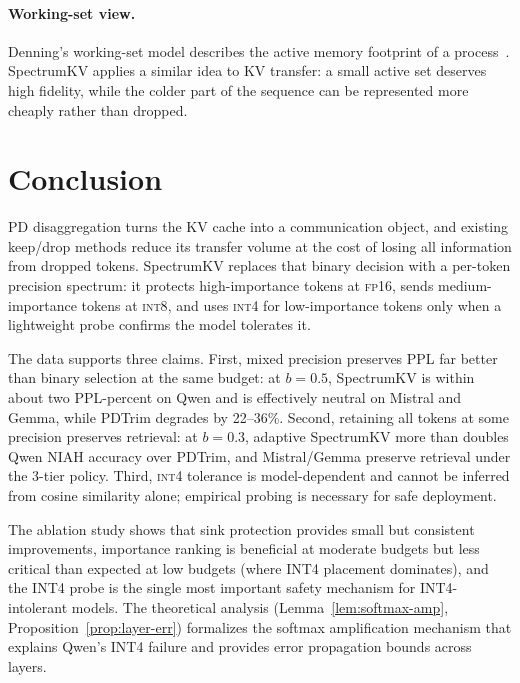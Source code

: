 \documentclass[11pt]{article}
\newcommand{\method}{SpectrumKV}
\newcommand{\niah}{NIAH}
\newcommand{\budget}{b}
\newcommand{\pct}{\%}
\newcommand{\fp}{\textsc{fp16}}
\newcommand{\intviii}{\textsc{int8}}
\newcommand{\intiv}{\textsc{int4}}
\theoremstyle{plain}
\theoremstyle{definition}
\begin{document}
\paragraph{Working-set view.}
Denning's working-set model describes the active memory footprint of a process~\citep{denning1968working}.  \method{} applies a similar idea to KV transfer: a small active set deserves high fidelity, while the colder part of the sequence can be represented more cheaply rather than dropped.

\section{Conclusion}
\label{sec:conclusion}

PD disaggregation turns the KV cache into a communication object, and existing keep/drop methods reduce its transfer volume at the cost of losing all information from dropped tokens.  \method{} replaces that binary decision with a per-token precision spectrum: it protects high-importance tokens at \fp{}, sends medium-importance tokens at \intviii{}, and uses \intiv{} for low-importance tokens only when a lightweight probe confirms the model tolerates it.

The data supports three claims.  First, mixed precision preserves PPL far better than binary selection at the same budget: at $\budget=0.5$, \method{} is within about two PPL-percent on Qwen and is effectively neutral on Mistral and Gemma, while PDTrim degrades by 22--36\pct{}.  Second, retaining all tokens at some precision preserves retrieval: at $\budget=0.3$, adaptive \method{} more than doubles Qwen \niah{} accuracy over PDTrim, and Mistral/Gemma preserve retrieval under the 3-tier policy.  Third, \intiv{} tolerance is model-dependent and cannot be inferred from cosine similarity alone; empirical probing is necessary for safe deployment.

The ablation study shows that sink protection provides small but consistent improvements, importance ranking is beneficial at moderate budgets but less critical than expected at low budgets (where INT4 placement dominates), and the INT4 probe is the single most important safety mechanism for INT4-intolerant models.  The theoretical analysis (Lemma~\ref{lem:softmax-amp}, Proposition~\ref{prop:layer-err}) formalizes the softmax amplification mechanism that explains Qwen's INT4 failure and provides error propagation bounds across layers.
\end{document}
